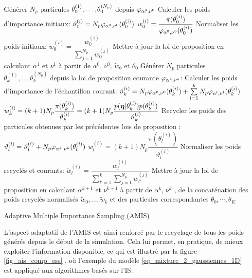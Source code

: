 \begin{algorithm}[p!]
	\begin{algorithmic}
	\State Générer $N_p$ particules ${\theta}_0^{(1)}, \dots, {\theta}_0^{(N_p)}$ depuis  ${\varphi}_{\alpha^0, \nu^0}$
		\State Calculer les poids d'importance initiaux:
		\State $\vartheta_0^{(i)} = N_p {\varphi}_{\alpha^0, \nu^0}({\theta}_0^{(i)})$
		\State $w_0^{(i)} = \dfrac{\pi(\theta_0^{(i)})}{{\varphi}_{\alpha^0, \nu^0}(\theta_0^{(i)})}$
	\EndFor
	\State Normaliser les poids initiaux:
		\State $\tilde{w}_0^{(i)} = \dfrac{w_0^{(i)}}{\sum\limits_{j=1}^{N_p}w_0^{(j)}}$
	\EndFor
	\State Mettre à jour la loi de proposition en calculant $\alpha^1$ et $\nu^1$ à partir de $\alpha^0$, $\nu^0$, $\tilde{w}_0$ {et $\theta_0$}
		\State Générer $N_p$ particules $\theta_k^{(1)}, \dots, \theta_k^{(N_p)}$ depuis la loi de proposition courante ${\varphi}_{\alpha^k, \nu^k}$:
			\State Calculer les poids d'importance de l'échantillon courant:
			\State $\vartheta_k^{(i)} = N_p {\varphi}_{\alpha^0, \nu^0}(\theta_k^{(i)}) + \sum\limits_{l=1}^k N_p {\varphi}_{\alpha^l, \nu^l}(\theta_k^{(i)})$
			\State $w_k^{(i)} = (k+1)N_p \dfrac{\pi(\theta_k^{(i)})}{\vartheta_k^{(i)}} = (k+1)N_p \dfrac{p({\bm{\eta}} | \theta_k^{(i)})p(\theta_k^{(i)})}{\vartheta_k^{(i)}}$
			\EndFor
		\State Recycler les poids des particules obtenues par les précédentes lois de proposition :
				\State $\vartheta_l^{(i)} = \vartheta_l^{(i)} + N_p {\varphi}_{\alpha^k, \nu^k}(\theta_l^{(i)})$
				\State $w_l^{(i)} = (k+1) N_p \dfrac{\pi(\theta_l^{(i)})}{\vartheta_l^{(i)}}$
				\EndFor
			\EndFor
		\State Normaliser les poids recyclés et courants:
				\State $\tilde{w}_l^{(i)} = \dfrac{w_l^{(i)}}{\sum\limits_{l'=1}^k\sum\limits_{j=1}^{N_p} w_{l'}^{(j)}}$
				\EndFor
			\EndFor
		\State Mettre à jour la loi de proposition en calculant $\alpha^{k+1}$ et $\nu^{k+1}$ à partir de $\alpha^k$, $\nu^k$ , de la concaténation des poids recyclés normalisés $\tilde{w}_0, \dots, \tilde{w}_k$ {et des particules correspondantes $\theta_0, \cdots, \theta_K$}
		\EndFor
	\end{algorithmic}
	\caption{Adaptive Multiple Importance Sampling (AMIS)}
	\label{algo_AMIS}
\end{algorithm}


L'aspect adaptatif de l'AMIS est ainsi renforcé par le recyclage de tous les poids générés depuis le début de la simulation. Cela lui permet, en pratique, de mieux exploiter l'information disponible, ce qui est illustré par la figure \ref{fig_ais_comp_ess} , où l'exemple du modèle \ref{eq_mixture_2_gaussiennes_1D} est appliqué aux algorithmes basés sur l'IS.

